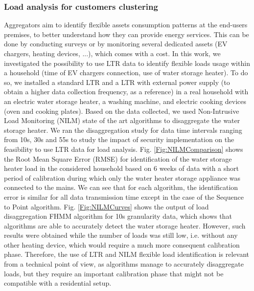 \documentclass[conference]{IEEEtran}
\begin{document}
\subsubsection{Load analysis for customers clustering}
\label{section:NILMclustering}
Aggregators aim to identify flexible assets consumption patterns at the end-users premises, to better understand how they can   provide energy services. This can be done by conducting surveys or by monitoring several dedicated assets (EV chargers, heating devices, ...), which comes with a cost. In this work,  we investigated the possibility to use LTR data to identify flexible loads usage within a household (time of EV chargers connection, use of water storage heater). To do so, we installed a standard LTR and a LTR with external power supply (to obtain a higher data collection frequency, as a reference) in a real household with an electric water storage heater, a washing machine, and electric cooking devices (oven and cooking plates). Based on the data collected, we used Non-Intrusive Load Monitoring (NILM) state of the art algorithms to disaggregate the water storage heater.%
We ran the disaggregation study for data time intervals ranging from 10s, 30s and 55s to study the impact of security implementation on the feasibility to use LTR data for  load analysis.
%
%
   Fig. \ref{Fig:NILMComparison} shows the Root Mean Square Error (RMSE) for identification of the water storage heater load in the considered household based on 6 weeks of data with a short period of calibration during which only the water heater storage appliance was connected to the mains.  We can see that for each algorithm, the identification error is similar for all data transmission time except in the case of the Sequence to Point algorithm.
    Fig. \ref{Fig:NILMCurves} shows the output of load disaggregation FHMM algorithm for 10s granularity data, which shows that algorithms are able to accurately detect the water storage heater. However, such results were obtained while the number of loads was still low, i.e. without any other heating device, which would require a much more consequent calibration phase. Therefore, the use of LTR and  NILM flexible load identification is relevant from a technical point of view, as algorithms manage to accurately disaggregate loads, but they require an important calibration phase that might not be compatible with a residential setup.
   
\end{document}
